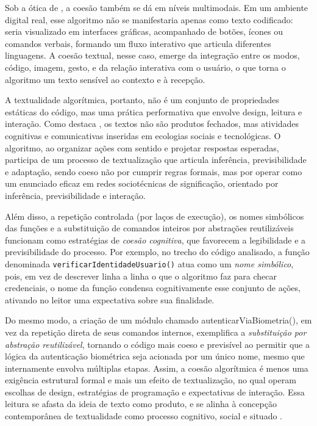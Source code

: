 \documentclass[portuguese]{textolivre}
\begin{document}
Sob a ótica de \textcite{marcuschi2008}, a coesão também se dá em níveis multimodais. Em um ambiente digital real, esse algoritmo não se manifestaria apenas como texto codificado: seria visualizado em interfaces gráficas, acompanhado de botões, ícones ou comandos verbais, formando um fluxo interativo que articula diferentes linguagens. A coesão textual, nesse caso, emerge da integração entre os modos, código, imagem, gesto, e da relação interativa com o usuário, o que torna o algoritmo um texto sensível ao contexto e à recepção.

A textualidade algorítmica, portanto, não é um conjunto de propriedades estáticas do código, mas uma prática performativa que envolve design, leitura e interação. Como destaca \textcite{beaugrande1997}, os textos não são produtos fechados, mas atividades cognitivas e comunicativas inseridas em ecologias sociais e tecnológicas. O algoritmo, ao organizar ações com sentido e projetar respostas esperadas, participa de um processo de textualização que articula inferência, previsibilidade e adaptação, sendo coeso não por cumprir regras formais, mas por operar como um enunciado eficaz em redes sociotécnicas de significação, orientado por inferência, previsibilidade e interação.

Além disso, a repetição controlada (por laços de execução), os nomes simbólicos das funções e a substituição de comandos inteiros por abstrações reutilizáveis funcionam como estratégias de \emph{coesão cognitiva}, que favorecem a legibilidade e a previsibilidade do processo. Por exemplo, no trecho do código analisado, a função denominada \lstinline[language=Python]{verificarIdentidadeUsuario()} atua como um \emph{nome simbólico}, pois, em vez de descrever linha a linha o que o algoritmo faz para checar credenciais, o nome da função condensa cognitivamente esse conjunto de ações, ativando no leitor uma expectativa sobre sua finalidade.

Do mesmo modo, a criação de um módulo chamado autenticarViaBiometria(), em vez da repetição direta de seus comandos internos, exemplifica a \emph{substituição por abstração reutilizável}, tornando o código mais coeso e previsível ao permitir que a lógica da autenticação biométrica seja acionada por um único nome, mesmo que internamente envolva múltiplas etapas. Assim, a coesão algorítmica é menos uma exigência estrutural formal e mais um efeito de textualização, no qual operam escolhas de design, estratégias de programação e expectativas de interação. Essa leitura se afasta da ideia de texto como produto, e se alinha à concepção contemporânea de textualidade como processo cognitivo, social e situado \cite{koch2006,marcuschi2008}.
\end{document}
